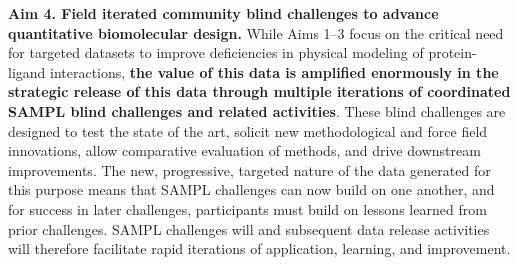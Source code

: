 \documentclass[11pt]{article}
\begin{document}
{\bf Aim 4. Field iterated community blind challenges to advance quantitative biomolecular design.}
While Aims 1--3 focus on the critical need for targeted datasets to improve deficiencies in physical modeling of protein-ligand interactions, \textbf{the value of this data is amplified enormously in the strategic release of this data through multiple iterations of coordinated SAMPL blind challenges and related activities}.
These blind challenges are designed to test the state of the art, solicit new methodological and force field innovations, allow comparative evaluation of methods, and drive downstream improvements.
The new, progressive, targeted nature of the data generated for this purpose means that SAMPL challenges can now build on one another, and for success in later challenges, participants must build on lessons learned from prior challenges.
SAMPL challenges will and subsequent data release activities will therefore facilitate rapid iterations of application, learning, and improvement.
\end{document}
